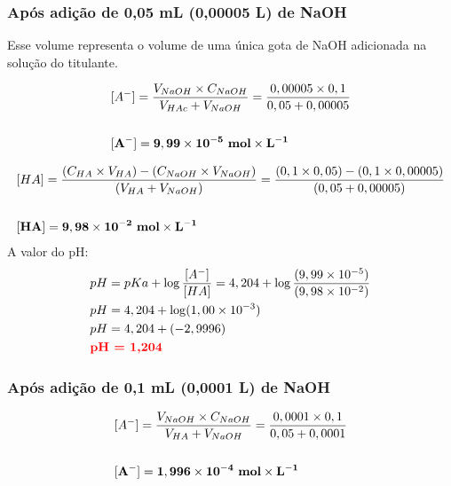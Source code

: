 \documentclass[a4paper, 12pt]{article}
\begin{document}
\subsubsection{Após adição de 0,05 mL (0,00005 L) de NaOH}
Esse volume representa o volume de uma única gota de NaOH adicionada na solução do titulante. 

\begin{align*}
	& [A^{-}] = \frac{ V_{NaOH} \times C_{NaOH} }{ V_{HAc} + V_{NaOH} } = \frac{0,00005 \times 0,1}{0,05 + 0,00005} \\ \\
	& \mathbf{[A^{-}] = 9,99 \times 10^{-5} \text{ \textbf{mol}} \times L^{-1}}
\end{align*}

\begin{align*}
	& [HA] = \frac{ (C_{HA} \times V_{HA}) - (C_{NaOH} \times V_{NaOH}) }{ (V_{HA} + V_{NaOH}) } = \frac{ (0,1 \times 0,05) - (0,1 \times 0,00005) }{ (0,05 + 0,00005) }\\ \\
	& \mathbf{[HA] = 9,98 \times 10^{-2} \text{ \textbf{mol}} \times L^{-1}}
\end{align*}
A valor do pH:
\begin{align*}
 	& pH = pKa + \log \frac{[A^{-}]}{[HA]} = 4,204 + \log \frac{(9,99 \times 10^{-5})}{(9,98 \times 10^{-2})} \\
 	& pH = 4,204 + \log (1,00 \times 10^{-3}) \\
	& pH = 4,204 + (-2,9996) \\
	& \textbf{\textcolor{red}{pH = 1,204}}
\end{align*}

\subsubsection{Após adição de 0,1 mL (0,0001 L) de NaOH}
	\begin{align*}
		& [A^{-}] = \frac{ V_{NaOH} \times C_{NaOH} }{ V_{HA} + V_{NaOH} } = \frac{0,0001 \times 0,1}{0,05 + 0,0001} \\ \\
		& \mathbf{[A^{-}] = 1,996 \times 10^{-4} \text{ \textbf{mol}} \times L^{-1}}
	\end{align*}
\end{document}
